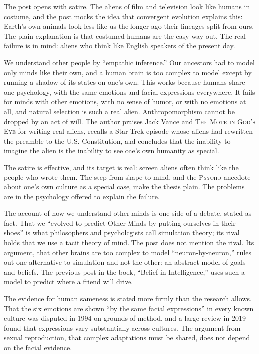 \begin{afterword}
\summaryhead

The post opens with satire. The aliens of film and television look like humans in costume, and the post mocks the idea that convergent evolution explains this: Earth's own animals look less like us the longer ago their lineages split from ours. The plain explanation is that costumed humans are the easy way out. The real failure is in mind: aliens who think like English speakers of the present day.

We understand other people by ``empathic inference.'' Our ancestors had to model only minds like their own, and a human brain is too complex to model except by running a shadow of its states on one's own. This works because humans share one psychology, with the same emotions and facial expressions everywhere. It fails for minds with other emotions, with no sense of humor, or with no emotions at all, and natural selection is such a real alien. Anthropomorphism cannot be dropped by an act of will. The author praises Jack Vance and \textsc{The Mote in God's Eye} for writing real aliens, recalls a Star Trek episode whose aliens had rewritten the preamble to the U.S. Constitution, and concludes that the inability to imagine the alien is the inability to see one's own humanity as special.

\responsehead

The satire is effective, and its target is real: screen aliens often think like the people who wrote them. The step from shape to mind, and the \textsc{Psycho} anecdote about one's own culture as a special case, make the thesis plain. The problems are in the psychology offered to explain the failure.

The account of how we understand other minds is one side of a debate, stated as fact. That we ``evolved to predict Other Minds by putting ourselves in their shoes'' is what philosophers and psychologists call simulation theory; its rival holds that we use a tacit theory of mind. The post does not mention the rival. Its argument, that other brains are too complex to model ``neuron-by-neuron,'' rules out one alternative to simulation and not the other: an abstract model of goals and beliefs. The previous post in the book, ``Belief in Intelligence,'' uses such a model to predict where a friend will drive.

The evidence for human sameness is stated more firmly than the research allows. That the six emotions are shown ``by the same facial expressions'' in every known culture was disputed in 1994 on grounds of method, and a large review in 2019 found that expressions vary substantially across cultures. The argument from sexual reproduction, that complex adaptations must be shared, does not depend on the facial evidence.


\end{afterword}
